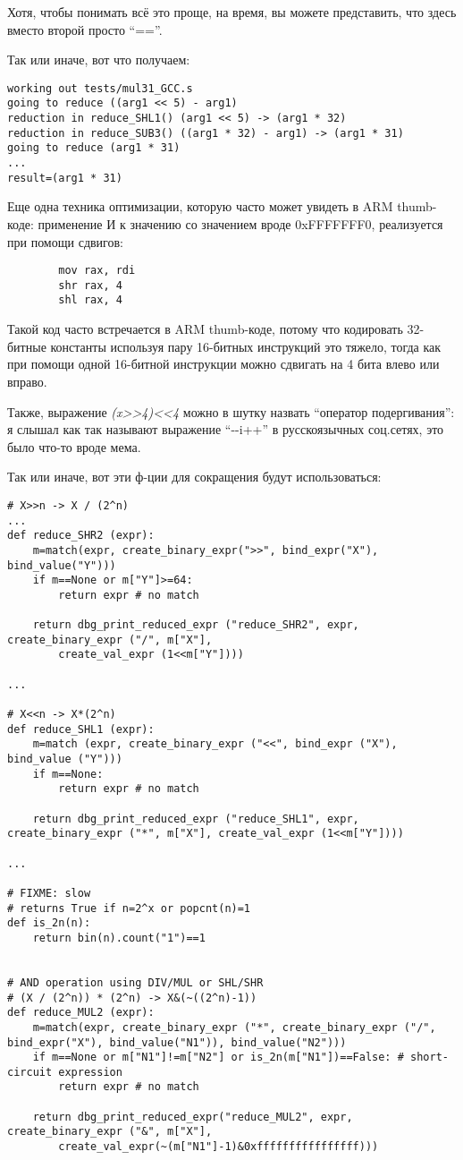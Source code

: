 Хотя, чтобы понимать всё это проще, на время, вы можете представить, что здесь вместо второй  просто ``==''.

Так или иначе, вот что получаем:

\begin{lstlisting}
working out tests/mul31_GCC.s
going to reduce ((arg1 << 5) - arg1)
reduction in reduce_SHL1() (arg1 << 5) -> (arg1 * 32)
reduction in reduce_SUB3() ((arg1 * 32) - arg1) -> (arg1 * 31)
going to reduce (arg1 * 31)
...
result=(arg1 * 31)
\end{lstlisting}

Еще одна техника оптимизации, которую часто может увидеть в ARM thumb-коде: применение И к значению со значением вроде
0xFFFFFFF0, реализуется при помощи сдвигов:

\begin{lstlisting}
        mov rax, rdi
        shr rax, 4
        shl rax, 4
\end{lstlisting}

Такой код часто встречается в ARM thumb-коде, потому что кодировать 32-битные константы используя пару 16-битных инструкций
это тяжело, тогда как при помощи одной 16-битной инструкции можно сдвигать на 4 бита влево или вправо.

Также, выражение \textit{(x>>4)<<4} можно в шутку назвать ``оператор подергивания'':
я слышал как так называют выражение ``-{}-i++'' в русскоязычных соц.сетях, это было что-то вроде мема.

Так или иначе, вот эти ф-ции для сокращения будут использоваться:

\begin{lstlisting}
# X>>n -> X / (2^n)
...
def reduce_SHR2 (expr):
    m=match(expr, create_binary_expr(">>", bind_expr("X"), bind_value("Y")))
    if m==None or m["Y"]>=64:
        return expr # no match

    return dbg_print_reduced_expr ("reduce_SHR2", expr, create_binary_expr ("/", m["X"],
        create_val_expr (1<<m["Y"])))

...

# X<<n -> X*(2^n)
def reduce_SHL1 (expr):
    m=match (expr, create_binary_expr ("<<", bind_expr ("X"), bind_value ("Y")))
    if m==None:
        return expr # no match
    
    return dbg_print_reduced_expr ("reduce_SHL1", expr, create_binary_expr ("*", m["X"], create_val_expr (1<<m["Y"])))

...

# FIXME: slow
# returns True if n=2^x or popcnt(n)=1
def is_2n(n):
    return bin(n).count("1")==1


# AND operation using DIV/MUL or SHL/SHR
# (X / (2^n)) * (2^n) -> X&(~((2^n)-1))
def reduce_MUL2 (expr):
    m=match(expr, create_binary_expr ("*", create_binary_expr ("/", bind_expr("X"), bind_value("N1")), bind_value("N2")))
    if m==None or m["N1"]!=m["N2"] or is_2n(m["N1"])==False: # short-circuit expression
        return expr # no match

    return dbg_print_reduced_expr("reduce_MUL2", expr, create_binary_expr ("&", m["X"],
        create_val_expr(~(m["N1"]-1)&0xffffffffffffffff)))
\end{lstlisting}


